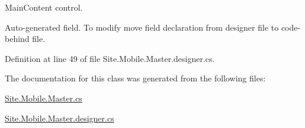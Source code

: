 Main\+Content control. 

Auto-\/generated field. To modify move field declaration from designer file to code-\/behind file. 

Definition at line 49 of file Site.\+Mobile.\+Master.\+designer.\+cs.



The documentation for this class was generated from the following files\+:\begin{DoxyCompactItemize}
\item 
\mbox{\hyperlink{Site_8Mobile_8Master_8cs}{Site.\+Mobile.\+Master.\+cs}}\item 
\mbox{\hyperlink{Site_8Mobile_8Master_8designer_8cs}{Site.\+Mobile.\+Master.\+designer.\+cs}}\end{DoxyCompactItemize}
